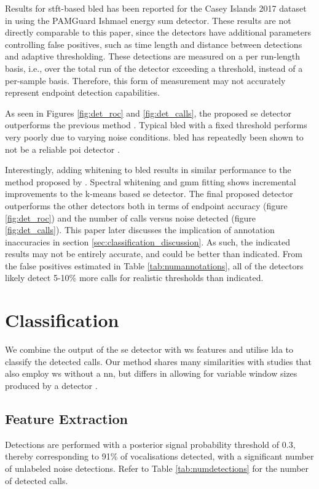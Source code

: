 {Results for \ac{stft}-based \ac{bled} has been reported for the Casey Islands 2017 dataset in \citep{casey2017} using the PAMGuard Ishmael energy sum detector. These results are not directly comparable to this paper, since the detectors have additional parameters controlling false positives, such as time length and distance between detections and adaptive thresholding. These detections are measured on a per run-length basis, i.e., over the total run of the detector exceeding a threshold, instead of a per-sample basis. Therefore, this form of measurement may not accurately represent endpoint detection capabilities. 

As seen in Figures \ref{fig:det_roc} and \ref{fig:det_calls}, the proposed \ac{se} detector outperforms the previous method \citep{mypaper}. Typical \ac{bled} with a fixed threshold performs very poorly due to varying noise conditions. \ac{bled} has repeatedly been shown to not be a reliable \ac{poi} detector \citep{internalsignaldetection, entropyJASA}. 

Interestingly, adding whitening to \ac{bled} results in similar performance to the method proposed by \citet{mypaper}. Spectral whitening and \ac{gmm} fitting shows incremental improvements to the k-means based \ac{se} detector. The final proposed detector outperforms the other detectors both in terms of endpoint accuracy (figure \ref{fig:det_roc}) and the number of calls versus noise detected (figure \ref{fig:det_calls}). This paper later discusses the implication of annotation inaccuracies in section \ref{sec:classification_discussion}. As such, the indicated results may not be entirely accurate, and could be better than indicated. From the false positives estimated in Table \ref{tab:numannotations}, all of the detectors likely detect 5-10\% more calls for realistic thresholds than indicated.

\clearpage
\section{Classification}
\label{sec:cls}
We combine the output of the \ac{se} detector with \ac{ws} features and utilise \ac{lda} to classify the detected calls. Our method shares many similarities with studies that also employ \ac{ws} without a \ac{nn}, but differs in allowing for variable window sizes produced by a detector \citep{ws_audio, ws_ecg}.

\subsection{Feature Extraction}
Detections are performed with a posterior signal probability threshold of 0.3, thereby corresponding to 91\% of vocalisations detected, with a significant number of unlabeled noise detections. Refer to Table \ref{tab:numdetections} for the number of detected calls. 

}
